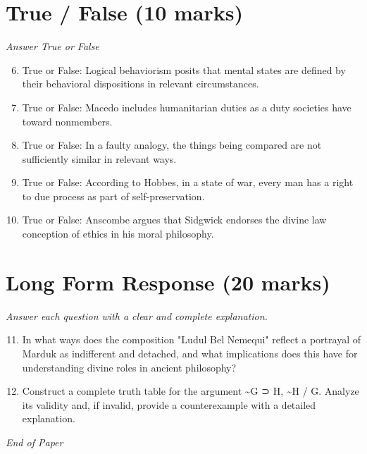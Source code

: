 \documentclass[12pt]{article}
\begin{document}
\section*{True / False (10 marks)}
\textit{Answer True or False}
\begin{enumerate}[label=\arabic*.]
\setcounter{enumi}{5}
\item True or False: Logical behaviorism posits that mental states are defined by their behavioral dispositions in relevant circumstances.
\item True or False: Macedo includes humanitarian duties as a duty societies have toward nonmembers.
\item True or False: In a faulty analogy, the things being compared are not sufficiently similar in relevant ways.
\item True or False: According to Hobbes, in a state of war, every man has a right to due process as part of self-preservation.
\item True or False: Anscombe argues that Sidgwick endorses the divine law conception of ethics in his moral philosophy.
\end{enumerate}

\section*{Long Form Response (20 marks)}
\textit{Answer each question with a clear and complete explanation.}
\begin{enumerate}[label=\arabic*.]
\setcounter{enumi}{10}
\item In what ways does the composition "Ludul Bel Nemequi" reflect a portrayal of Marduk as indifferent and detached, and what implications does this have for understanding divine roles in ancient philosophy?
\item Construct a complete truth table for the argument \textasciitilde{}G ⊃ H, \textasciitilde{}H / G. Analyze its validity and, if invalid, provide a counterexample with a detailed explanation.
\end{enumerate}

\vfill
\noindent\textit{End of Paper}
\end{document}
